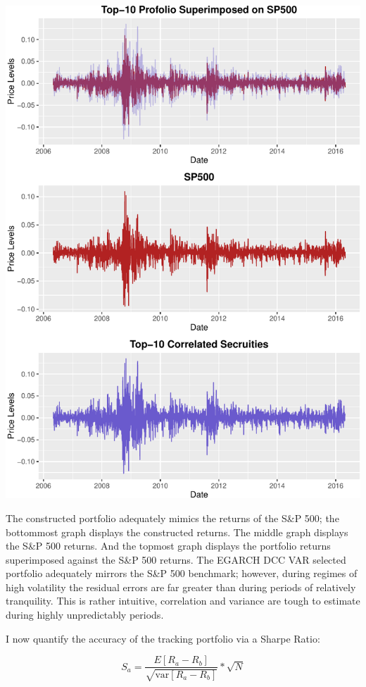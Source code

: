 \documentclass[]{elsarticle} %
\makeatletter
\def\maxwidth{\ifdim\Gin@nat@width>\linewidth\linewidth
\else\Gin@nat@width\fi}
\let\Oldincludegraphics\includegraphics
\renewcommand{\includegraphics}[1]{\Oldincludegraphics[width=\maxwidth]{#1}}
\makeatother
\begin{document}
\includegraphics{report_files/figure-latex/analysis23223d011-1.pdf}

The constructed portfolio adequately mimics the returns of the S\&P 500;
the bottommost graph displays the constructed returns. The middle graph
displays the S\&P 500 returns. And the topmost graph displays the
portfolio returns superimposed against the S\&P 500 returns. The EGARCH
DCC VAR selected portfolio adequately mirrors the S\&P 500 benchmark;
however, during regimes of high volatility the residual errors are far
greater than during periods of relatively tranquility. This is rather
intuitive, correlation and variance are tough to estimate during highly
unpredictably periods.

I now quantify the accuracy of the tracking portfolio via a Sharpe
Ratio:

\[S_a = \frac{E[R_a-R_b]}{\sqrt{\mathrm{var}[R_a-R_b]}} * \sqrt{N}\]
\end{document}
